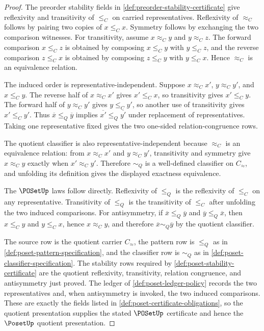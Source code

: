 \begin{proof}
The preorder stability fields in \autoref{def:preorder-stability-certificate} give reflexivity and transitivity of $\le_C$ on carried representatives. Reflexivity of $\approx_C$ follows by pairing two copies of $x\le_C x$. Symmetry follows by exchanging the two comparison witnesses. For transitivity, assume $x\approx_C y$ and $y\approx_C z$. The forward comparison $x\le_C z$ is obtained by composing $x\le_C y$ with $y\le_C z$, and the reverse comparison $z\le_C x$ is obtained by composing $z\le_C y$ with $y\le_C x$. Hence $\approx_C$ is an equivalence relation.

The induced order is representative-independent. Suppose $x\approx_C x'$, $y\approx_C y'$, and $x\le_C y$. The reverse half of $x\approx_C x'$ gives $x'\le_C x$, so transitivity gives $x'\le_C y$. The forward half of $y\approx_C y'$ gives $y\le_C y'$, so another use of transitivity gives $x'\le_C y'$. Thus $\overline{x}\le_Q\overline{y}$ implies $\overline{x'}\le_Q\overline{y'}$ under replacement of representatives. Taking one representative fixed gives the two one-sided relation-congruence rows.

The quotient classifier is also representative-independent because $\approx_C$ is an equivalence relation: from $x\approx_C x'$ and $y\approx_C y'$, transitivity and symmetry give $x\approx_C y$ exactly when $x'\approx_C y'$. Therefore $\sim_Q$ is a well-defined classifier on $C_{\!\approx}$, and unfolding its definition gives the displayed exactness equivalence.

The $\POSetUp$ laws follow directly. Reflexivity of $\le_Q$ is the reflexivity of $\le_C$ on any representative. Transitivity of $\le_Q$ is the transitivity of $\le_C$ after unfolding the two induced comparisons. For antisymmetry, if $\overline{x}\le_Q\overline{y}$ and $\overline{y}\le_Q\overline{x}$, then $x\le_C y$ and $y\le_C x$, hence $x\approx_C y$, and therefore $\overline{x}\sim_Q\overline{y}$ by the quotient classifier.

The source row is the quotient carrier $C_{\!\approx}$, the pattern row is $\le_Q$ as in \autoref{def:poset-pattern-specification}, and the classifier row is $\sim_Q$ as in \autoref{def:poset-classifier-specification}. The stability rows required by \autoref{def:poset-stability-certificate} are the quotient reflexivity, transitivity, relation congruence, and antisymmetry just proved. The ledger of \autoref{def:poset-ledger-policy} records the two representatives and, when antisymmetry is invoked, the two induced comparisons. These are exactly the fields listed in \autoref{def:poset-certificate-obligations}, so the quotient presentation supplies the stated $\POSetUp$ certificate and hence the $\PosetUp$ quotient presentation.
\end{proof}

